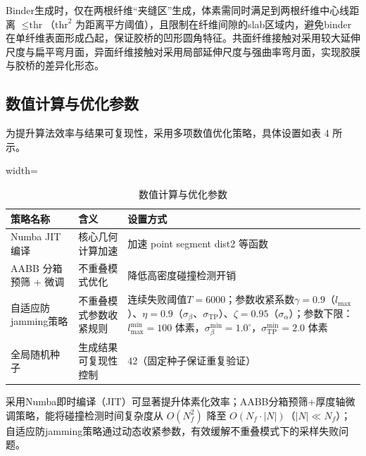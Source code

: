 {\raggedright
\hspace{2em}Binder生成时，仅在两根纤维“夹缝区”生成，体素需同时满足到两根纤维中心线距离 $\leq \text{thr}$（$\text{thr}^2$ 为距离平方阈值），且限制在纤维间隙的slab区域内，避免binder在单纤维表面形成凸起，保证胶桥的凹形圆角特征。共面纤维接触对采用较大延伸尺度与扁平弯月面，异面纤维接触对采用局部延伸尺度与强曲率弯月面，实现胶膜与胶桥的差异化形态。
\par}


\subsection{数值计算与优化参数}
为提升算法效率与结果可复现性，采用多项数值优化策略，具体设置如表 4 所示。
\\
\begin{table}[H]
\centering
\begingroup
\small
\setlength{\tabcolsep}{6pt}
\renewcommand{\arraystretch}{1.15}
\begin{adjustbox}{width=\columnwidth}
\begin{tabular}{p{2.2cm}p{3.0cm}p{3.2cm}}
\toprule
策略名称 & 含义 & 设置方式 \\
\midrule
Numba JIT 编译 & 核心几何计算加速 & 加速 point segment dist2 等函数 \\
AABB 分箱预筛 + 微调 & 不重叠模式优化 & 降低高密度碰撞检测开销 \\
自适应防jamming策略 & 不重叠模式参数收紧规则 & 连续失败阈值$T = 6000$；参数收紧系数$\gamma = 0.9$（$l_{\text{max}}$）、$\eta = 0.9$（$\sigma_{\beta}、\sigma_{\text{TP}}$）、$\zeta = 0.95$（$\sigma_{\alpha}$）；参数下限：$l_{\text{max}}^{\text{min}} = 100$ 体素，$\sigma_{\beta}^{\text{min}} = 1.0^\circ$，$\sigma_{\text{TP}}^{\text{min}} = 2.0$ 体素 \\
全局随机种子 & 生成结果可复现性控制 & 42（固定种子保证重复验证） \\
\bottomrule
\end{tabular}
\end{adjustbox}
\endgroup
\caption{数值计算与优化参数}
\label{tab:optimization_params}
\end{table}

采用Numba即时编译（JIT）可显著提升体素化效率；AABB分箱预筛+厚度轴微调策略，能将碰撞检测时间复杂度从 $O(N_f^2)$ 降至 $O(N_f \cdot |N|)$（$|N| \ll N_f$）；自适应防jamming策略通过动态收紧参数，有效缓解不重叠模式下的采样失败问题。

